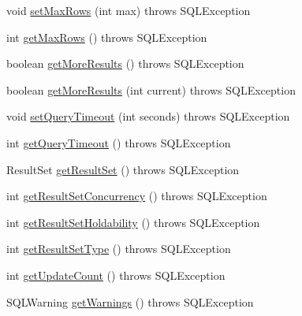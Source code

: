 \begin{DoxyCompactItemize}
\item 
void \mbox{\hyperlink{classcom_1_1mysql_1_1cj_1_1jdbc_1_1_statement_wrapper_aa312a016fd837074a60a71caf73782d6}{set\+Max\+Rows}} (int max)  throws S\+Q\+L\+Exception 
\item 
int \mbox{\hyperlink{classcom_1_1mysql_1_1cj_1_1jdbc_1_1_statement_wrapper_a01684e81b28e073167d4383bc3c94f19}{get\+Max\+Rows}} ()  throws S\+Q\+L\+Exception 
\item 
boolean \mbox{\hyperlink{classcom_1_1mysql_1_1cj_1_1jdbc_1_1_statement_wrapper_a57530b5e0e25dab299d5e4b6eb659cf3}{get\+More\+Results}} ()  throws S\+Q\+L\+Exception 
\item 
boolean \mbox{\hyperlink{classcom_1_1mysql_1_1cj_1_1jdbc_1_1_statement_wrapper_a56a13d2b4e4865896ce4c0e10a7f9a67}{get\+More\+Results}} (int current)  throws S\+Q\+L\+Exception 
\item 
void \mbox{\hyperlink{classcom_1_1mysql_1_1cj_1_1jdbc_1_1_statement_wrapper_a26f8947b44321bdf8d810ff448e22be6}{set\+Query\+Timeout}} (int seconds)  throws S\+Q\+L\+Exception 
\item 
int \mbox{\hyperlink{classcom_1_1mysql_1_1cj_1_1jdbc_1_1_statement_wrapper_accbc653d61bbd17de7a1e98e43943715}{get\+Query\+Timeout}} ()  throws S\+Q\+L\+Exception 
\item 
Result\+Set \mbox{\hyperlink{classcom_1_1mysql_1_1cj_1_1jdbc_1_1_statement_wrapper_a4c17788b158de6b54aa9b1666ae70987}{get\+Result\+Set}} ()  throws S\+Q\+L\+Exception 
\item 
int \mbox{\hyperlink{classcom_1_1mysql_1_1cj_1_1jdbc_1_1_statement_wrapper_aa12b5822b164ba6e673d60459da7053c}{get\+Result\+Set\+Concurrency}} ()  throws S\+Q\+L\+Exception 
\item 
int \mbox{\hyperlink{classcom_1_1mysql_1_1cj_1_1jdbc_1_1_statement_wrapper_a3aa30079ce2fccf4c1c61ca018a16f18}{get\+Result\+Set\+Holdability}} ()  throws S\+Q\+L\+Exception 
\item 
int \mbox{\hyperlink{classcom_1_1mysql_1_1cj_1_1jdbc_1_1_statement_wrapper_acbe7f2e06d520be6d0c9422b310e3780}{get\+Result\+Set\+Type}} ()  throws S\+Q\+L\+Exception 
\item 
int \mbox{\hyperlink{classcom_1_1mysql_1_1cj_1_1jdbc_1_1_statement_wrapper_aef4c4c1549c5b36624a1ab77c40338e2}{get\+Update\+Count}} ()  throws S\+Q\+L\+Exception 
\item 
S\+Q\+L\+Warning \mbox{\hyperlink{classcom_1_1mysql_1_1cj_1_1jdbc_1_1_statement_wrapper_affd0e8669e098b00992cf1d56d74e05a}{get\+Warnings}} ()  throws S\+Q\+L\+Exception 
\item 

\end{DoxyCompactItemize}
